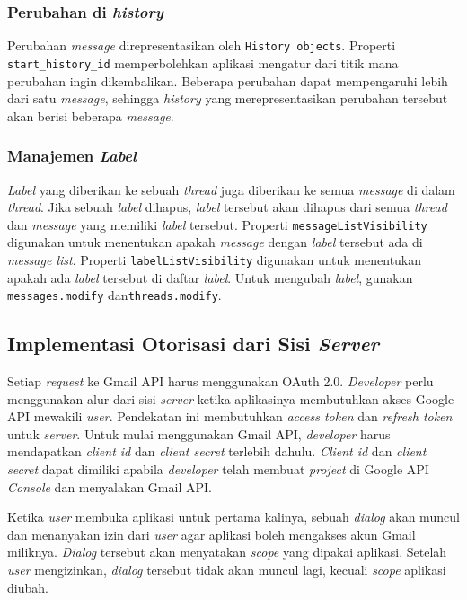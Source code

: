 \subsubsection{Perubahan di \textit{history}}
Perubahan \textit{message} direpresentasikan oleh \texttt{History objects}. Properti \texttt{start\_history\_id} memperbolehkan aplikasi mengatur dari titik mana perubahan ingin dikembalikan. Beberapa perubahan dapat mempengaruhi lebih dari satu \textit{message}, sehingga \textit{history} yang merepresentasikan perubahan tersebut akan berisi beberapa \textit{message}.

\subsubsection{Manajemen \textit{Label}}
\textit{Label} yang diberikan ke sebuah \textit{thread} juga diberikan ke semua \textit{message} di dalam \textit{thread}. Jika sebuah \textit{label} dihapus, \textit{label} tersebut akan dihapus dari semua \textit{thread} dan \textit{message} yang memiliki \textit{label} tersebut. Properti \texttt{messageListVisibility} digunakan untuk menentukan apakah \textit{message} dengan \textit{label} tersebut ada di \textit{message list}. Properti \texttt{labelListVisibility} digunakan untuk menentukan apakah ada \textit{label} tersebut di daftar \textit{label}. Untuk mengubah \textit{label}, gunakan \texttt{messages.modify} dan\texttt{threads.modify}.

\subsection{Implementasi Otorisasi dari Sisi \textit{Server}}
Setiap \textit{request} ke Gmail API harus menggunakan OAuth 2.0. \textit{Developer} perlu menggunakan alur dari sisi \textit{server} ketika aplikasinya membutuhkan akses Google API mewakili \textit{user}. Pendekatan ini membutuhkan \textit{access token} dan \textit{refresh token} untuk \textit{server}. Untuk mulai menggunakan Gmail API, \textit{developer} harus mendapatkan \textit{client id} dan \textit{client secret} terlebih dahulu. \textit{Client id} dan \textit{client secret} dapat dimiliki apabila \textit{developer} telah membuat \textit{project} di Google API \textit{Console} dan menyalakan Gmail API.

Ketika \textit{user} membuka aplikasi untuk pertama kalinya, sebuah \textit{dialog} akan muncul dan menanyakan izin dari \textit{user} agar aplikasi boleh mengakses akun Gmail miliknya. \textit{Dialog} tersebut akan menyatakan \textit{scope} yang dipakai aplikasi. Setelah \textit{user} mengizinkan, \textit{dialog} tersebut tidak akan muncul lagi, kecuali \textit{scope} aplikasi diubah.

